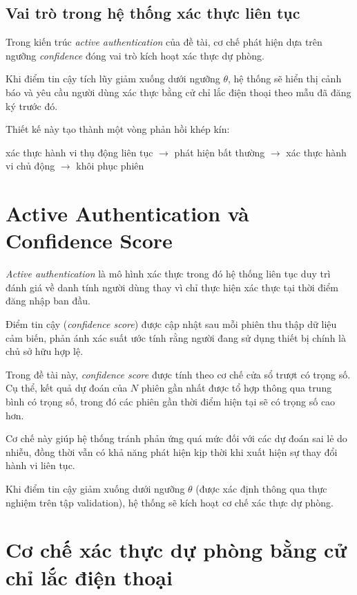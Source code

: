 \documentclass[../DoAn.tex]{subfiles}
\begin{document}
    \subsection{Vai trò trong hệ thống xác thực liên tục}
    
    Trong kiến trúc \textit{active authentication} của đề tài, cơ chế phát hiện dựa trên ngưỡng \textit{confidence} đóng vai trò kích hoạt xác thực dự phòng.
    
    Khi điểm tin cậy tích lũy giảm xuống dưới ngưỡng $\theta$, hệ thống sẽ hiển thị cảnh báo và yêu cầu người dùng xác thực bằng cử chỉ lắc điện thoại theo mẫu đã đăng ký trước đó.
    
    Thiết kế này tạo thành một vòng phản hồi khép kín:
    
    \begin{center}
    xác thực hành vi thụ động liên tục
    $\rightarrow$
    phát hiện bất thường
    $\rightarrow$
    xác thực hành vi chủ động
    $\rightarrow$
    khôi phục phiên
    \end{center}

    \section{Active Authentication và Confidence Score}

    \textit{Active authentication} là mô hình xác thực trong đó hệ thống liên tục duy trì đánh giá về danh tính người dùng thay vì chỉ thực hiện xác thực tại thời điểm đăng nhập ban đầu.
    
    Điểm tin cậy (\textit{confidence score}) được cập nhật sau mỗi phiên thu thập dữ liệu cảm biến, phản ánh xác suất ước tính rằng người đang sử dụng thiết bị chính là chủ sở hữu hợp lệ.
    
    Trong đề tài này, \textit{confidence score} được tính theo cơ chế cửa sổ trượt có trọng số. Cụ thể, kết quả dự đoán của $N$ phiên gần nhất được tổ hợp thông qua trung bình có trọng số, trong đó các phiên gần thời điểm hiện tại sẽ có trọng số cao hơn.
    
    Cơ chế này giúp hệ thống tránh phản ứng quá mức đối với các dự đoán sai lẻ do nhiễu, đồng thời vẫn có khả năng phát hiện kịp thời khi xuất hiện sự thay đổi hành vi liên tục.
    
    Khi điểm tin cậy giảm xuống dưới ngưỡng $\theta$ (được xác định thông qua thực nghiệm trên tập validation), hệ thống sẽ kích hoạt cơ chế xác thực dự phòng.

    \section{Cơ chế xác thực dự phòng bằng cử chỉ lắc điện thoại}
\end{document}
